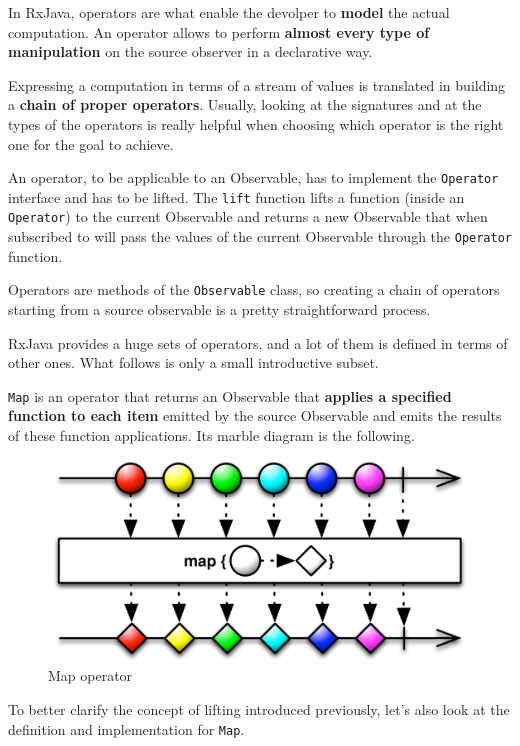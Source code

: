 In RxJava, operators are what enable the devolper to \textbf{model} the
actual computation. An operator allows to perform \textbf{almost every
type of manipulation} on the source observer in a declarative way.

Expressing a computation in terms of a stream of values is translated in
building a \textbf{chain of proper operators}. Usually, looking at the
signatures and at the types of the operators is really helpful when
choosing which operator is the right one for the goal to achieve.

An operator, to be applicable to an Observable, has to implement the
\texttt{Operator} interface and has to be lifted. The \texttt{lift}
function lifts a function (inside an \texttt{Operator}) to the current
Observable and returns a new Observable that when subscribed to will
pass the values of the current Observable through the \texttt{Operator}
function.

Operators are methods of the \texttt{Observable} class, so creating a
chain of operators starting from a source observable is a pretty
straightforward process.

RxJava provides a huge sets of operators, and a lot of them is defined
in terms of other ones. What follows is only a small introductive
subset.

\label{map}

\texttt{Map} is an operator that returns an Observable that
\textbf{applies a specified function to each item} emitted by the source
Observable and emits the results of these function applications. Its
marble diagram is the following.

\begin{figure}[htbp]
\centering
\includegraphics[scale=0.5]{imgs/map.png}
\caption{Map operator}
\end{figure}

To better clarify the concept of lifting introduced previously, let's
also look at the definition and implementation for \texttt{Map}.

